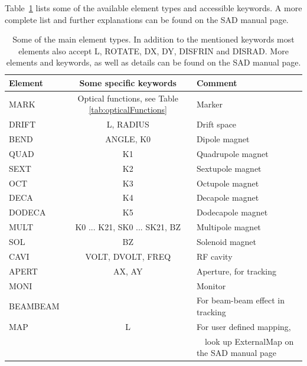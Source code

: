 \documentclass{article}
\begin{document}
Table~\ref{tab:elements} lists some of the available element types and accessible keywords. A more complete list and further explanations can be found on the SAD manual page.

\begin{table}[t]
	\begin{center}
	\caption{Some of the main element types. In addition to the mentioned keywords most elements also accept L, ROTATE, DX, DY, DISFRIN and DISRAD. More elements and keywords, as well as details can be found on the SAD manual page.}
	\label{tab:elements}
	\begin{tabular}[c]{lcl}
	Element		&	Some specific keywords		&	Comment				\\	\hline
	MARK		&	Optical functions, see Table \ref{tab:opticalFunctions}		 	&	Marker				\\
	DRIFT		&	L, RADIUS				&	Drift space			\\
	BEND		&	ANGLE, K0				&	Dipole magnet			\\
	QUAD		&	K1						&	Quadrupole magnet		\\
	SEXT		&	K2						&	Sextupole magnet		\\
	OCT 		&	K3						&	Octupole magnet		\\
	DECA		&	K4						&	Decapole magnet		\\
	DODECA		&	K5						&	Dodecapole magnet		\\
	MULT		&	K0 ... K21, SK0 ... SK21, BZ	&	Multipole magnet		\\
	SOL			&	BZ						&	Solenoid magnet		\\
	CAVI			&	VOLT, DVOLT, FREQ		&	RF cavity				\\
	APERT		&	AX,  AY					&	Aperture, for tracking		\\
	MONI		&							&	Monitor				\\
	BEAMBEAM	&							&	For beam-beam effect in tracking	\\
	MAP			& 	L						&	For user defined mapping, \\ & & \ \ look up ExternalMap on the SAD manual page \\
	\end{tabular}
	\end{center}
\end{table}



\end{document}
